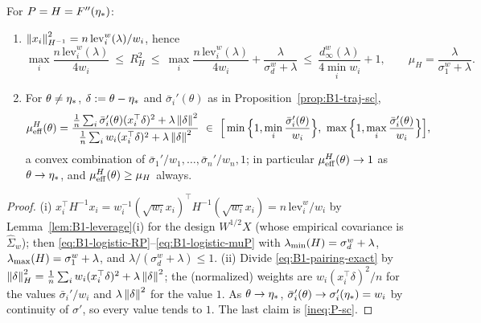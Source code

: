 \begin{proposition}\label{prop:B1-newton}
For $P=H=F''(\eta_\ast)$:
\begin{enumerate}[label=(\roman*)]
\item $\left\|x_i\right\|_{H^{-1}}^2=n\,\mathrm{lev}^w_i(\lambda)/w_i$, hence
\begin{equation}\label{eq:B1-newton-RP}
\max_i\frac{n\,\mathrm{lev}^w_i(\lambda)}{4w_i}\ \le\ R_H^2\ \le\ \max_i\frac{n\,\mathrm{lev}^w_i(\lambda)}{4w_i}+\frac{\lambda}{\sigma^w_d+\lambda}
\ \le\ \frac{d^w_\infty(\lambda)}{4\min_iw_i}+1,\qquad \mu_H=\frac{\lambda}{\sigma^w_1+\lambda}.
\end{equation}
\item For $\theta\neq\eta_\ast$, $\delta:=\theta-\eta_\ast$ and $\bar\sigma_i'(\theta)$ as in
Proposition~\ref{prop:B1-traj-sc},
\begin{equation}\label{eq:B1-muEff-newton}
\muEff^H(\theta)=\frac{\frac1n\sum_i\bar\sigma_i'(\theta)(x_i^\top\delta)^2+\lambda\norm{\delta}^2}
{\frac1n\sum_iw_i(x_i^\top\delta)^2+\lambda\norm{\delta}^2}
\ \in\ \Big[\min\Big\{1,\min_i\frac{\bar\sigma_i'(\theta)}{w_i}\Big\},\ \max\Big\{1,\max_i\frac{\bar\sigma_i'(\theta)}{w_i}\Big\}\Big],
\end{equation}
a convex combination of $\bar\sigma_1'/w_1,\dots,\bar\sigma_n'/w_n,1$; in particular
$\mu_{\mathrm{eff}}^H(\theta)\to1$ as $\theta\to\eta_\ast$, and $\mu_{\mathrm{eff}}^H(\theta)\ge\mu_H$ always.
\end{enumerate}
\end{proposition}
\begin{proof}
(i) $x_i^\top H^{-1}x_i=w_i^{-1}(\sqrt{w_i}x_i)^\top H^{-1}(\sqrt{w_i}x_i)=n\,\mathrm{lev}^w_i/w_i$ by
Lemma~\ref{lem:B1-leverage}(i) for the design $W^{1/2}X$ (whose empirical covariance is $\hat\Sigma_w$);
then \eqref{eq:B1-logistic-RP}--\eqref{eq:B1-logistic-muP} with $\lambda_{\min}(H)=\sigma^w_d+\lambda$,
$\lambda_{\max}(H)=\sigma^w_1+\lambda$, and $\lambda/(\sigma_d^w+\lambda)\le1$.
(ii) Divide \eqref{eq:B1-pairing-exact} by $\left\|\delta\right\|_H^2=\frac1n\sum_iw_i(x_i^\top\delta)^2+\lambda\left\|\delta\right\|^2$;
the (normalized) weights are $w_i(x_i^\top\delta)^2/n$ for the values $\bar\sigma_i'/w_i$ and
$\lambda\left\|\delta\right\|^2$ for the value $1$. As $\theta\to\eta_\ast$, $\bar\sigma_i'(\theta)\to\sigma_i'(\eta_\ast)=w_i$
by continuity of $\sigma'$, so every value tends to $1$. The last claim is \eqref{ineq:P-sc}.
\end{proof}

